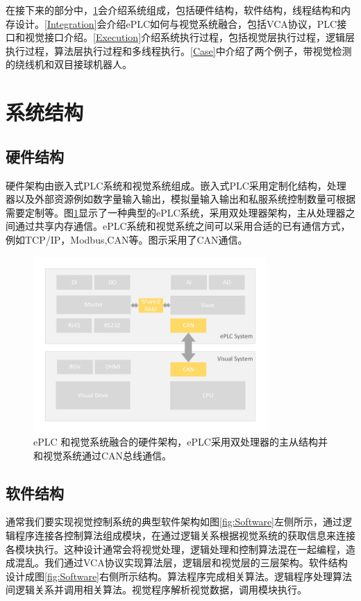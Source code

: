 \documentclass[journal,UTF8]{IEEEtran}
\begin{document}
在接下来的部分中，\ref{SystemStructure}会介绍系统组成，包括硬件结构，软件结构，线程结构和内存设计。\ref{Integration}会介绍ePLC如何与视觉系统融合，包括VCA协议，PLC接口和视觉接口介绍。\ref{Execution}介绍系统执行过程，包括视觉层执行过程，逻辑层执行过程，算法层执行过程和多线程执行。\ref{Case}中介绍了两个例子，带视觉检测的绕线机和双目接球机器人。

\section{系统结构}
\label{SystemStructure}
\subsection{硬件结构}
硬件架构由嵌入式PLC系统和视觉系统组成。嵌入式PLC采用定制化结构，处理器以及外部资源例如数字量输入输出，模拟量输入输出和私服系统控制数量可根据需要定制等。图\ref{fig:Hardware}显示了一种典型的ePLC系统，采用双处理器架构，主从处理器之间通过共享内存通信。ePLC系统和视觉系统之间可以采用合适的已有通信方式，例如TCP/IP，Modbus,CAN等。图示采用了CAN通信。

\begin{figure}
	\centering
	\includegraphics[width=3.5in]{fig/Hardware.pdf}
	\caption{ePLC 和视觉系统融合的硬件架构，ePLC采用双处理器的主从结构并和视觉系统通过CAN总线通信。}
	\label{fig:Hardware}
\end{figure}
\subsection{软件结构}
通常我们要实现视觉控制系统的典型软件架构如图\ref{fig:Software}左侧所示，通过逻辑程序连接各控制算法组成模块，在通过逻辑关系根据视觉系统的获取信息来连接各模块执行。这种设计通常会将视觉处理，逻辑处理和控制算法混在一起编程，造成混乱。我们通过VCA协议实现算法层，逻辑层和视觉层的三层架构。软件结构设计成图\ref{fig:Software}右侧所示结构。算法程序完成相关算法。逻辑程序处理算法间逻辑关系并调用相关算法。视觉程序解析视觉数据，调用模块执行。
\end{document}
